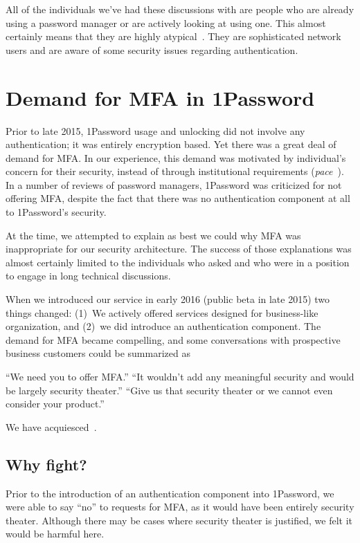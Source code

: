 \documentclass{soups}
\begin{document}
All of the individuals we've had these discussions with are people who are already using a password manager or are actively looking at using one.
This almost certainly means that they are highly atypical~\autocite{Stobert2014:agony}. 
They are sophisticated network users and are aware of some security issues regarding authentication.

\section{Demand for MFA in 1Password}\label{sec:demand}

Prior to late 2015, 1Password usage and unlocking did not involve any
authentication; it was entirely encryption based.
Yet there was a great deal of demand for MFA\@.
In our experience, this demand was motivated by individual's concern for their security,
instead of through institutional requirements (\textit{pace}~\autocite{CristofaroDFN13}).
In a number of reviews of password managers, 1Password was criticized for not offering MFA, despite the fact that there was no authentication component at all to 1Password's security.

At the time, we attempted to explain as best we could why MFA was inappropriate for our security architecture. The success of those explanations was almost certainly limited to the individuals who asked and who were in a position to engage in long technical discussions.

When we introduced our service in early 2016 (public beta in late 2015) two things changed:
(1)~We actively offered services designed for business-like organization, and (2)~we did introduce an authentication component.
The demand for MFA became compelling,
and some conversations with prospective business customers could be summarized as 

“We need you to offer MFA\@.”\newline
“It wouldn't add any meaningful security and would be largely security theater.”\newline
“Give us that security theater or we cannot even consider your product.”

We have acquiesced~\autocite{Fillion18:mfa}.

\subsection{Why fight?}

Prior to the introduction of an authentication component into 1Password, we were able to say ``no'' to requests for MFA, as it would have been entirely security theater.
Although there may be cases where security theater is justified, we felt it would be harmful here.
\end{document}
